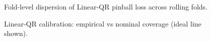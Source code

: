 \documentclass[
  a4paper,
  DIV=11,
  numbers=noendperiod]{scrreprt}
\begin{document}
\begin{figure}


\caption{\label{fig-lqr-pinball-dispersion}Fold-level dispersion of
Linear-QR pinball loss across rolling folds.}

\end{figure}%

\begin{figure}


\caption{\label{fig-lqr-calibration}Linear-QR calibration: empirical vs
nominal coverage (ideal line shown).}

\end{figure}%
\end{document}
